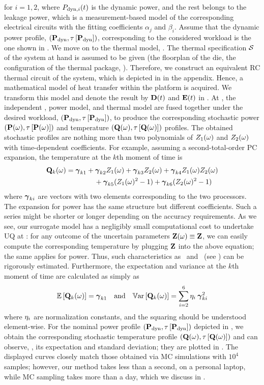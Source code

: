 for $i = 1, 2$, where $P_{\text{dyn}, i}(t)$ is the dynamic power, and the rest belongs to the leakage power, which is a measurement-based model of the corresponding electrical circuits with the fitting coefficients $\alpha_j$ and $\beta_i$. Assume that the dynamic power profile, $\profPdyn$, corresponding to the considered workload is the one shown in . We move on to the thermal model, . The thermal specification $\mathcal{S}$ of the system at hand is assumed to be given (the floorplan of the die, the configuration of the thermal package, \etc). Therefore, we construct an equivalent RC thermal circuit of the system, which is depicted in  in the appendix. Hence, a mathematical model of heat transfer within the platform is acquired. We transform this model and denote the result by $\mCF(\t)$ and $\mCS(\t)$ in . At , the independent \rvs, power model, and thermal model are fused together under the desired workload, $\profPdyn$, to produce the corresponding stochastic power $\profP{\o}$ and temperature $\profT{\o}$ profiles. The obtained stochastic profiles are nothing more than two polynomials of $Z_1(\omega)$ and $Z_2(\omega)$ with time-dependent coefficients. For example, assuming a second-total-order PC expansion, the temperature at the $k$th moment of time is
\begin{align*}
  \mathbf{Q}_k(\omega) &= {\boldsymbol\gamma}_{k1} + {\boldsymbol\gamma}_{k2} Z_1(\omega) + {\boldsymbol\gamma}_{k3} Z_2(\omega) + {\boldsymbol\gamma}_{k4} Z_1(\omega) Z_2(\omega) \\
  & \qquad \qquad {} + {\boldsymbol\gamma}_{k5} (Z_1(\omega)^2 - 1) + {\boldsymbol\gamma}_{k6} (Z_2(\omega)^2 - 1)
\end{align*}
where ${\boldsymbol\gamma}_{ki}$ are vectors with two elements corresponding to the two processors. The expansion for power has the same structure but different coefficients. Such a series might be shorter or longer depending on the accuracy requirements. As we see, our surrogate model has a negligibly small computational cost to undertake UQ at : for any outcome of the uncertain parameters $\mathbf{Z}(\omega) \equiv \mathbf{Z}$, we can easily compute the corresponding temperature by plugging $\mathbf{Z}$ into the above equation; the same applies for power. Thus, such characteristics as \cdfs\ and \pdfs\ (see ) can be rigorously estimated. Furthermore, the expectation and variance at the $k$th moment of time are calculated as simply as
\[
  \mathbb{E}\left[\mathbf{Q}_k(\omega)\right] = {\boldsymbol\gamma}_{k1} \hspace{1em} \text{and} \hspace{1em} \mathbb{V}\text{ar}\left[\mathbf{Q}_k(\omega)\right] = \sum_{i = 2}^{6} \eta_i \: {\boldsymbol\gamma}_{ki}^2
\]
where $\eta_i$ are normalization constants, and the squaring should be understood element-wise. For the nominal power profile $\profPdyn$ depicted in , we obtain the corresponding stochastic temperature profile $\profT{\o}$ and can observe, \eg, its expectation and standard deviation; they are plotted in . The displayed curves closely match those obtained via MC simulations with $10^4$ samples; however, our method takes less than a second, on a personal laptop, while MC sampling takes more than a day, which we discuss in .

